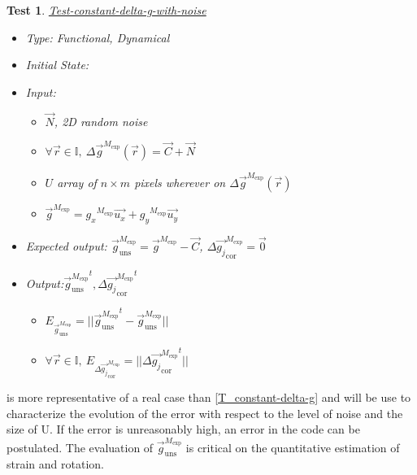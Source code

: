 \documentclass[12pt, titlepage]{article}
\newtheorem{Test}{Test}
\begin{document}
\begin{Test}\normalfont\underline{Test-constant-delta-g-with-noise}
\label{T_constant-delta-g-with-noise}
\begin{itemize}
\item Type: Functional, Dynamical
\item Initial State: 
\item Input: 
	\begin{itemize}
	\item $\overrightarrow{N}$, 2D random noise
	\item $\forall \vec{r} \in \mathbb{I}, \ \Delta \overrightarrow{g}^{M_{\text{exp}}}(\vec{r})=\overrightarrow{C} + \overrightarrow{N}$
	\item $U$ array of $n \times m$ pixels wherever on $\Delta \overrightarrow{g}^{M_{\text{exp}}}(\vec{r})$ 
	\item $\overrightarrow{g}^{M_{\text{exp}}}={g_x}^{M_{\text{exp}}}\overrightarrow{u_x}+{g_y}^{M_{\text{exp}}}\overrightarrow{u_y}$
	\end{itemize}
\item Expected output: $\overrightarrow{g}_{\text{uns}}^{M_{\text{exp}}}=\overrightarrow{g}^{M_{\text{exp}}}-\overrightarrow{C}$,  $\Delta\overrightarrow{g_{j}}_{\text{cor}}^{M_{\text{exp}}}=\overrightarrow{0}$
\item Output:${\overrightarrow{g}_{\text{uns}}^{M_{\text{exp}}}}^{t}, {\Delta\overrightarrow{g_{j}}_{\text{cor}}^{M_{\text{exp}}}}^{t}$
	\begin{itemize}
	\item $E_{\overrightarrow{g}_{\text{uns}}^{M_{\text{exp}}}}=||{\overrightarrow{g}_{\text{uns}}^{M_{\text{exp}}}}^{t}-\overrightarrow{g}_{\text{uns}}^{M_{\text{exp}}}||$
	\item $\forall \vec{r} \in \mathbb{I}, \ E_{\Delta\overrightarrow{g_{j}}_{\text{cor}}^{M_{\text{exp}}}}=||{\Delta\overrightarrow{g_{j}}_{\text{cor}}^{M_{\text{exp}}}}^{t}||$
	\end{itemize}
\end{itemize}
\end{Test}

 is more representative of a real case than \cref{T_constant-delta-g} and will be use to characterize the evolution of the error with respect to the level of noise and the size of U. If the error is unreasonably high, an error in the code can be postulated. The evaluation of $\overrightarrow{g}_{\text{uns}}^{M_{\text{exp}}}$ is critical on the quantitative estimation of strain and rotation.
\end{document}
